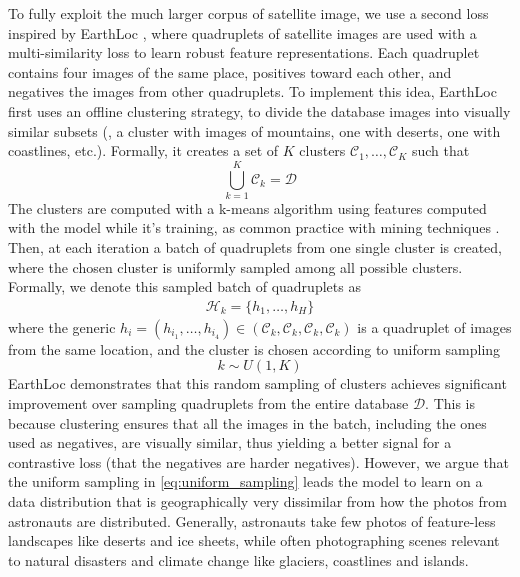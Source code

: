 To fully exploit the much larger corpus of satellite image, we use a second loss inspired by EarthLoc \cite{Berton_2024_EarthLoc}, where quadruplets of satellite images are used with a multi-similarity loss \cite{Wang_2019_multi_similarity_loss} to learn robust feature representations.
Each quadruplet contains four images of the same place, \ie positives toward each other, and negatives \wrt the images from other quadruplets.
To implement this idea, EarthLoc~\cite{Berton_2024_EarthLoc} first uses an offline clustering strategy, to divide the database images into visually similar subsets (\eg, a cluster with images of mountains, one with deserts, one with coastlines, etc.). Formally, it creates a set of $K$ clusters $\mathcal{C}_1, \ldots, \mathcal{C}_K$ such that
{\small
\begin{equation}
    \bigcup_{k=1}^{K} \mathcal{C}_k = \mathcal{D}
\end{equation}
}
The clusters are computed with a k-means algorithm using features computed with the model while it's training, as common practice with mining techniques \cite{Arandjelovic_2018_netvlad}.
Then, at each iteration a batch of quadruplets from one single cluster is created, where the chosen cluster is uniformly sampled among all possible clusters. Formally, we denote this sampled batch of quadruplets as 
{\small
\begin{align}
    \mathcal{H}_k = \{h_1, \ldots, h_H \}
\end{align}
}
where the generic $h_i=(h_{i_1}, \ldots, h_{i_4})\in (\mathcal{C}_k,\mathcal{C}_k,\mathcal{C}_k,\mathcal{C}_k)$ is a quadruplet of images from the same location, and the cluster is chosen according to uniform sampling
{\small
\begin{equation}
    k \sim U(1,K)
    \label{eq:uniform_sampling}
\end{equation}
}
EarthLoc demonstrates that this random sampling of clusters achieves significant improvement over sampling quadruplets from the entire database $\mathcal{D}$. This is because clustering ensures that all the images in the batch, including the ones used as negatives, are visually similar, thus yielding a better signal for a contrastive loss (\ie that the negatives are harder negatives).
However, we argue that the uniform sampling in \cref{eq:uniform_sampling}  leads the model to learn on a data distribution that is geographically very dissimilar from how the photos from astronauts are distributed. Generally, astronauts take few photos of feature-less landscapes like deserts and ice sheets, while often photographing scenes relevant to natural disasters and climate change like glaciers, coastlines and islands.
